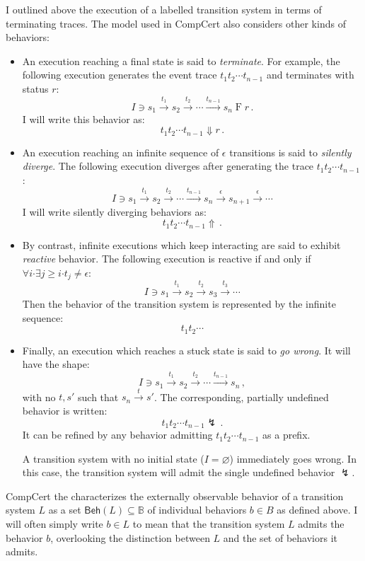 \documentclass[draft,11pt]{report}
\theoremstyle{definition}
\newcommand{\kw}[1]{\ensuremath{ \mathsf{#1} }}
\newcommand{\bdot}{\boldsymbol{\cdot}}
\begin{document}
I outlined above the execution of a labelled transition system
in terms of terminating traces.
The model used in CompCert also considers other kinds of behaviors:
\begin{itemize}
\item An execution reaching a final state is said to
    \emph{terminate}.
    For example,
    the following execution generates
    the event trace $t_1 t_2 \cdots t_{n-1}$
    and terminates with status $r$:
    \[
        I \ni s_1 \stackrel{t_1}{\rightarrow}
          s_2 \stackrel{t_2}{\rightarrow}
          \cdots \stackrel{t_{n-1}}{\rightarrow}
          s_n \mathrel{F} r \,.
    \]
    I will write this behavior as:
    \[
      t_1 t_2 \cdots t_{n-1} \Downarrow r
      \,.
    \]
\item An execution reaching
    an infinite sequence of $\epsilon$ transitions
    is said to \emph{silently diverge}.
    The following execution diverges after
    generating the trace $t_1 t_2 \cdots t_{n-1}$:
    \[
        I \ni s_1 \stackrel{t_1}{\rightarrow}
          s_2 \stackrel{t_2}{\rightarrow}
          \cdots \stackrel{t_{n-1}}{\rightarrow}
          s_n \stackrel{\epsilon}{\rightarrow}
          s_{n+1} \stackrel{\epsilon}{\rightarrow}
          \cdots
    \]
    I will write silently diverging behaviors as:
    \[
      t_1 t_2 \cdots t_{n-1} \Uparrow
      \,.
    \]
\item By contrast,
    infinite executions which keep interacting
    are said to exhibit \emph{reactive} behavior.
    The following execution
    is reactive if and only if
    $\forall i \bdot \exists j \ge i \bdot t_j \ne \epsilon$:
    \[
        I \ni s_1 \stackrel{t_1}{\rightarrow}
          s_2 \stackrel{t_2}{\rightarrow}
          s_3 \stackrel{t_3}{\rightarrow}
          \cdots
    \]
    Then the behavior of the transition system
    is represented by the infinite sequence:
    \[
      t_1 t_2 \cdots
    \]
\item Finally, an execution which reaches a stuck state
    is said to \emph{go wrong}. It will have the shape:
    \[
        I \ni s_1 \stackrel{t_1}{\rightarrow}
          s_2 \stackrel{t_2}{\rightarrow}
          \cdots \stackrel{t_{n-1}}{\rightarrow}
          s_n \,,
    \]
    with no $t, s'$ such that
    $s_n \stackrel{t}{\rightarrow} s'$.
    The corresponding, partially undefined behavior is written:
    \[
      t_1 t_2 \cdots t_{n-1} \lightning
      \,.
    \]
    It can be refined by any behavior
    admitting $t_1 t_2 \cdots t_{n-1}$ as a prefix.

    A transition system with no initial state ($I = \varnothing$)
    immediately goes wrong.
    In this case,
    the transition system will admit the single undefined behavior $\lightning$.
\end{itemize}
CompCert the characterizes the externally observable behavior
of a transition system $L$
as a set $\kw{Beh}(L) \subseteq \mathbb{B}$ of
individual behaviors $b \in B$ as defined above.
I will often simply write $b \in L$
to mean that the transition system $L$
admits the behavior $b$,
overlooking the distinction between $L$
and the set of behaviors it admits.
\end{document}
